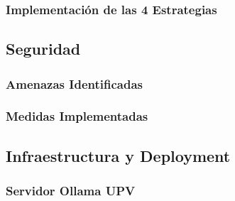 \subsubsection{Implementaci\'on de las 4 Estrategias}
\label{subsubsec:estrategias-impl}


\subsection{Seguridad}
\label{subsec:seguridad}

\subsubsection{Amenazas Identificadas}
\label{subsubsec:amenazas}


\subsubsection{Medidas Implementadas}
\label{subsubsec:medidas-seguridad}


\subsection{Infraestructura y Deployment}
\label{subsec:infraestructura}

\subsubsection{Servidor Ollama UPV}
\label{subsubsec:servidor-ollama}

